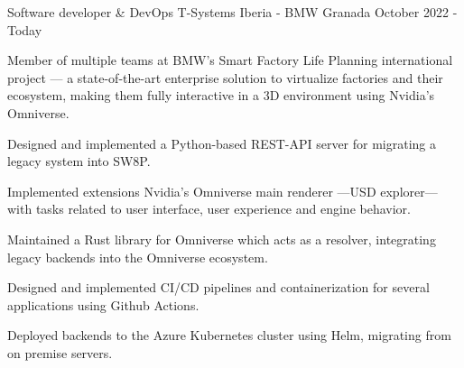 
\begin{cventries}
  \cventry
    {Software developer \& DevOps} %
    {T-Systems Iberia - BMW} %
    {Granada} %
    {October 2022 - Today} %
    {
      \begin{cvitems} %
        \item {Member of multiple teams at BMW's Smart Factory Life Planning international project — a state-of-the-art enterprise solution to virtualize factories and their ecosystem, making them fully interactive in a 3D environment using Nvidia's Omniverse.}
        \item {Designed and implemented a Python-based REST-API server for migrating a legacy system into SW8P.}
        \item {Implemented extensions Nvidia's Omniverse main renderer —USD explorer— with tasks related to user interface, user experience and engine behavior.}
        \item {Maintained a Rust library for Omniverse which acts as a resolver, integrating legacy backends into the Omniverse ecosystem.}
        \item {Designed and implemented CI/CD pipelines and containerization for several applications using Github Actions.}
        \item {Deployed backends to the Azure Kubernetes cluster using Helm, migrating from on premise servers.}
      \end{cvitems}
    }
\end{cventries}
